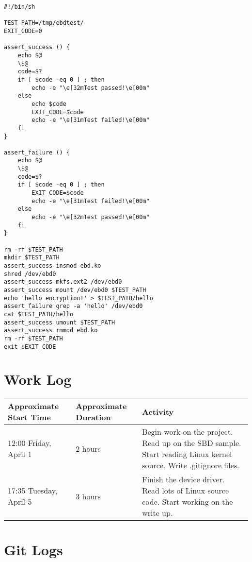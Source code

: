 \documentclass[10pt,conference,draftclsnofoot,onecolumn]{IEEEtran}
\begin{document}
\begin{lstlisting}
#!/bin/sh

TEST_PATH=/tmp/ebdtest/
EXIT_CODE=0

assert_success () {
	echo $@
	\$@
	code=$?
	if [ $code -eq 0 ] ; then
		echo -e "\e[32mTest passed!\e[00m"
	else
		echo $code
		EXIT_CODE=$code
		echo -e "\e[31mTest failed!\e[00m"
	fi
}

assert_failure () {
	echo $@
	\$@
	code=$?
	if [ $code -eq 0 ] ; then
		EXIT_CODE=$code
		echo -e "\e[31mTest failed!\e[00m"
	else
		echo -e "\e[32mTest passed!\e[00m"
	fi
}

rm -rf $TEST_PATH
mkdir $TEST_PATH
assert_success insmod ebd.ko
shred /dev/ebd0
assert_success mkfs.ext2 /dev/ebd0
assert_success mount /dev/ebd0 $TEST_PATH
echo 'hello encryption!' > $TEST_PATH/hello
assert_failure grep -a 'hello' /dev/ebd0
cat $TEST_PATH/hello
assert_success umount $TEST_PATH
assert_success rmmod ebd.ko
rm -rf $TEST_PATH
exit $EXIT_CODE
\end{lstlisting}

\section{Work Log}
\begin{tabular}{|p{5cm}|p{5cm}|p{5cm}}
    \textbf{Approximate Start Time} & \textbf{Approximate Duration} & \textbf{Activity} \\
    \hline
    12:00 Friday, April 1 & 2 hours & Begin work on the project. Read up on the SBD sample. Start reading Linux kernel source. Write .gitignore files. \\
    17:35 Tuesday, April 5 & 3 hours & Finish the device driver. Read lots of Linux source code. Start working on the write up. \\
\end{tabular}

\bigskip
\bigskip

\section{Git Logs}

\clearpage
\printbibliography
\end{document}
